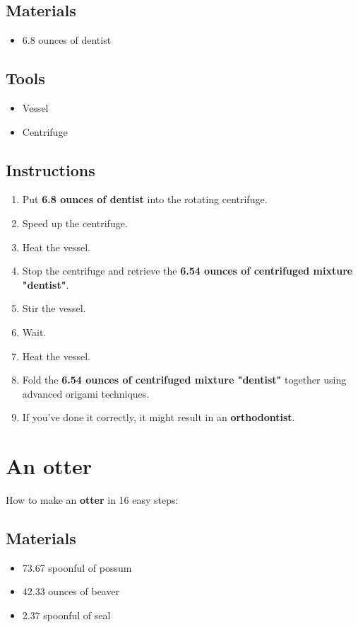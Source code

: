 \documentclass{article}
\begin{document}
\subsection{Materials}\begin{itemize}
\item 
6.8 ounces of dentist
\end{itemize}
\subsection{Tools}\begin{itemize}
\item 
Vessel
\item 
Centrifuge
\end{itemize}
\subsection{Instructions}\begin{enumerate}
\item 
Put \textbf{6.8 ounces of dentist} into the rotating centrifuge.
\item 
Speed up the centrifuge.
\item 
Heat the vessel.
\item 
Stop the centrifuge and retrieve the \textbf{6.54 ounces of centrifuged mixture "dentist"}.
\item 
Stir the vessel.
\item 
Wait.
\item 
Heat the vessel.
\item 
Fold the \textbf{6.54 ounces of centrifuged mixture "dentist"} together using advanced origami techniques.
\item 
If you've done it correctly, it might result in an \textbf{orthodontist}.
\end{enumerate}
\newpage
\section{An otter}How to make an \textbf{otter} in 16 easy steps:

\subsection{Materials}\begin{itemize}
\item 
73.67 spoonful of possum
\item 
42.33 ounces of beaver
\item 
2.37 spoonful of seal
\end{itemize}
\end{document}
